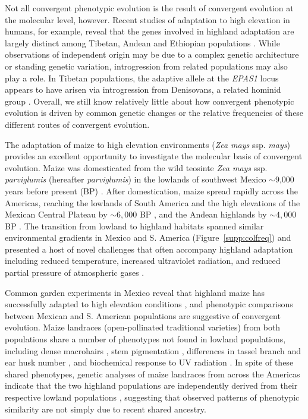 Not all convergent phenotypic evolution is the result of convergent evolution at the molecular level, however.  
Recent studies of adaptation to high elevation in humans, for example, reveal that the genes involved in highland adaptation are largely distinct among Tibetan, Andean and Ethiopian populations \cite[]{Bigham_2010_20838600,Scheinfeldt_2012_22264333,Alkorta-Aranburu_2012_23236293}. 
While observations of independent origin may be due to a complex genetic architecture or standing genetic variation, introgression from related populations may also play a role.  
In Tibetan populations, the adaptive allele at the \emph{EPAS1} locus appears to have arisen via introgression from Denisovans, a related hominid group \cite[]{huerta2014altitude}.
Overall, we still know relatively little about how convergent phenotypic evolution is driven by common genetic changes or the relative frequencies of these different routes of convergent evolution.

The adaptation of maize to high elevation environments (\emph{Zea mays} ssp. \emph{mays}) provides an excellent opportunity to investigate the molecular basis of convergent evolution.  
Maize was domesticated from the wild teosinte \emph{Zea mays} ssp. \emph{parviglumis} (hereafter \emph{parviglumis}) in the lowlands of southwest Mexico $\sim$9,000 years before present (BP) \cite[]{Matsuoka_2002_11983901,Piperno_2009_19307570,vanHeerwaarden_2011_21189301}. 
After domestication, maize spread rapidly across the Americas, reaching the lowlands of South America and the high elevations of the Mexican Central Plateau by $\sim 6,000$ BP \cite[]{Piperno_2006_69}, and the Andean highlands by $\sim 4,000$ BP \cite[]{Perry_2006_16511492,Grobman_2012_22307642}. 
The transition from lowland to highland habitats spanned similar environmental gradients in Mexico and S. America (Figure~\ref{supp:colfreq}) and presented a host of novel challenges that often accompany highland adaptation including reduced temperature, increased ultraviolet radiation, and reduced partial pressure of atmospheric gases \cite[]{Korner_2007_17988759}.

Common garden experiments in Mexico reveal that highland maize has successfully adapted to high elevation conditions \cite[]{Mercer2008}, and phenotypic comparisons between Mexican and S. American populations are suggestive of convergent evolution.  
Maize landraces (open-pollinated traditional varieties) from both populations share a number of phenotypes not found in lowland populations, including dense macrohairs \cite[]{Wilkes_1977,Wellhausen1957:book}, stem pigmentation \cite[]{Wilkes_1977,Wellhausen1957:book}, differences in tassel branch and ear husk number \cite[]{brewbaker2014diversity}, and biochemical response to UV radiation \cite[]{Casati2005}. 
In spite of these shared phenotypes, genetic analyses of maize landraces from across the Americas indicate that the two highland populations are independently derived from their respective lowland populations \cite[]{Vigouroux_2008_21632329, vanHeerwaarden_2011_21189301}, suggesting that observed patterns of phenotypic similarity are not simply due to recent shared ancestry. 


